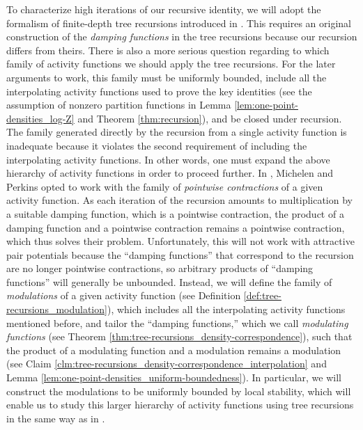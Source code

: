 \documentclass[11pt]{article}
\numberwithin{equation}{section}
\theoremstyle{plain}
\theoremstyle{definition}
\theoremstyle{remark}
\begin{document}
To characterize high iterations of our recursive identity, we will adopt the formalism of finite-depth tree recursions introduced in \cite[\S4.1]{michelen2023analyticity}.
This requires an original construction of the \emph{damping functions} in the tree recursions because our recursion differs from theirs.
There is also a more serious question regarding to which family of activity functions we should apply the tree recursions.
For the later arguments to work, this family must be uniformly bounded, include all the interpolating activity functions used to prove the key identities (see the assumption of nonzero partition functions in Lemma \ref{lem:one-point-densities_log-Z} and Theorem \ref{thm:recursion}), and be closed under recursion. 
The family generated directly by the recursion from a single activity function is inadequate because it violates the second requirement of including the interpolating activity functions.
In other words, one must expand the above hierarchy of activity functions in order to proceed further.
In \cite{michelen2021potential,michelen2023analyticity}, Michelen and Perkins opted to work with the family of \emph{pointwise contractions} of a given activity function.
As each iteration of the recursion amounts to multiplication by a suitable damping function, which is a pointwise contraction, the product of a damping function and a pointwise contraction remains a pointwise contraction, which thus solves their problem.
Unfortunately, this will not work with attractive pair potentials because the ``damping functions'' that correspond to the recursion are no longer pointwise contractions, so arbitrary products of ``damping functions'' will generally be unbounded.
Instead, we will define the family of \emph{modulations} of a given activity function (see Definition \ref{def:tree-recursions_modulation}), which includes all the interpolating activity functions mentioned before, and tailor the ``damping functions,'' which we call \emph{modulating functions} (see Theorem \ref{thm:tree-recursions_density-correspondence}), such that the product of a modulating function and a modulation remains a modulation (see Claim \ref{clm:tree-recursions_density-correspondence_interpolation} and Lemma \ref{lem:one-point-densities_uniform-boundedness}).
In particular, we will construct the modulations to be uniformly bounded by local stability, which will enable us to study this larger hierarchy of activity functions using tree recursions in the same way as in \cite{michelen2023analyticity}.
\end{document}
